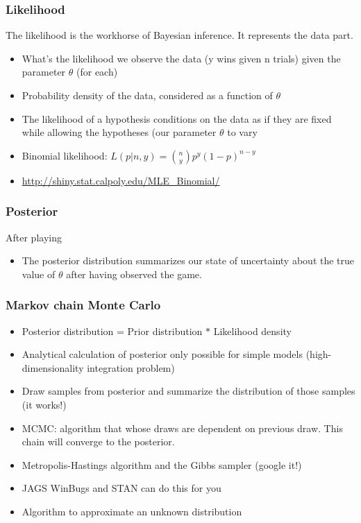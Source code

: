 \documentclass[hyperref={pdfpagelabels=false},unknownkeysallowed]{beamer}
\begin{document}
\begin{frame}
\frametitle{Likelihood}
The likelihood is the workhorse of Bayesian inference. It represents the data part. 
\begin{itemize}
\item What's the likelihood we observe the data (y wins given n trials)  given the parameter $\theta$ (for each)
\item Probability density of the data, considered as a function of $\theta$
\item The likelihood of a hypothesis conditions on the data as if they are fixed while allowing the hypotheses (our parameter $ \theta$ to vary
\item Binomial likelihood: $L(p|n,y)={n \choose y} p^y (1-p)^{n-y}$

\item \url{http://shiny.stat.calpoly.edu/MLE_Binomial/}
\end{itemize}
\note{}
\end{frame}


\begin{frame} \frametitle{Posterior}
After playing
\begin{itemize}
\item The posterior distribution summarizes our state of uncertainty about the true value of $\theta$ after having observed the game. 
\end{itemize}
\note{}
\end{frame}


\begin{frame}
\frametitle{Markov chain Monte Carlo}
\begin{itemize}
\item Posterior distribution = Prior distribution $*$ Likelihood density
\item Analytical calculation of posterior only possible for simple models (high-dimensionality integration problem)
\item Draw samples from posterior and summarize the distribution of those samples (it works!)
\item MCMC: algorithm that whose draws are dependent on previous draw. This chain will converge to the posterior.  
\item Metropolis-Hastings algorithm and the Gibbs sampler (google it!)
\item JAGS WinBugs and STAN can do this for you
\item Algorithm to approximate an unknown distribution

\end{itemize}
\end{frame}
\end{document}
